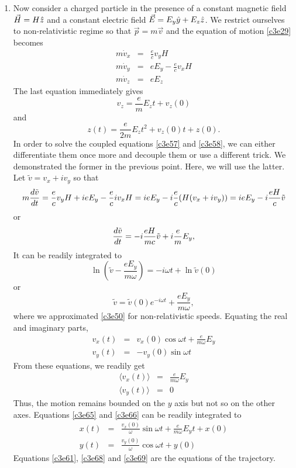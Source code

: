 \begin{enumerate}
\item Now consider a charged particle in the presence of a constant magnetic 
field $\vec{H} = H\hat{z}$ and a constant electric field $\vec{E} = E_y\hat{y} + 
E_z\hat{z}$. We restrict ourselves to non-relativistic regime so that $\vec{p} 
= m\vec{v}$ and the equation of motion \eqref{c3e29} becomes
\begin{eqnarray}
m\dot{v}_x &=& \frac{e}{c}v_yH \label{c3e58} \\
m\dot{v}_y &=& eE_y - \frac{e}{c}v_xH \label{c3e59} \\
m\dot{v}_z &=& eE_z \label{c3e60}
\end{eqnarray}
The last equation immediately gives
\[
v_z = \frac{e}{m}E_zt + v_z(0)
\]
and
\begin{equation}\label{c3e61}
z(t) = \frac{e}{2m}E_zt^2 + v_z(0)t + z(0).
\end{equation}
In order to solve the coupled equations \eqref{c3e57} and \eqref{c3e58}, we can 
either differentiate them once more and decouple them or use a different trick.
We demonstrated the former in the previous point. Here, we will use the latter.
Let $\tilde{v} = v_x + iv_y$ so that
\[
m\frac{d{\tilde{v}}}{d{t}} = \frac{e}{c}v_yH + ieE_y - \frac{e}{c}{iv_xH}
= ieE_y -i\frac{e}{c}(H(v_x + iv_y)) = ieE_y - i\frac{eH}{c}\tilde{v}
\]
or
\begin{equation}\label{c3e62}
\frac{d{\tilde{v}}}{d{t}} = -i\frac{eH}{mc}\tilde{v} + i\frac{e}{m}E_y,
\end{equation}
It can be readily integrated to
\[
\ln\left(\tilde{v} - \frac{eE_y}{m\omega}\right) = -i\omega t + \ln\tilde{v}(0)
\]
or
\begin{equation}\label{c3e63}
\tilde{v} = \tilde{v}(0)e^{-i\omega t} + \frac{eE_y}{m\omega},
\end{equation}
where we approximated \eqref{c3e50} for non-relativistic speeds. Equating the
real and imaginary parts,
\begin{eqnarray}
v_x(t) &=& v_x(0)\cos\omega t  + \frac{e}{m\omega}E_y\label{c3e64} \\
v_y(t) &=& -v_y(0)\sin\omega t \label{c3e65}
\end{eqnarray}
From these equations, we readily get
\begin{eqnarray}
\langle v_x(t) \rangle &=& \frac{e}{m\omega}E_y \label{c3e66} \\
\langle v_y(t) \rangle &=& 0 \label{c3e67}
\end{eqnarray}
Thus, the motion remains bounded on the $y$ axis but not so on the other axes. 
Equations \eqref{c3e65} and \eqref{c3e66} can be readily integrated to
\begin{eqnarray}
x(t) &=& 
	\frac{v_x(0)}{\omega}\sin\omega t + \frac{e}{m\omega}E_yt + x(0) 
	\label{c3e68} \\
y(t) &=& \frac{v_y(0)}{\omega}\cos\omega t + y(0) \label{c3e69}
\end{eqnarray}
Equations \eqref{c3e61}, \eqref{c3e68} and \eqref{c3e69} are the equations of 
the trajectory.


\end{enumerate}
